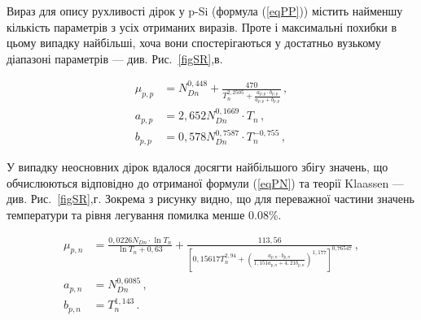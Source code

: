 \documentclass[12pt,a4paper,titlepage,oneside]{book}
\numberwithin{equation}{part}
\begin{document}
Вираз для опису рухливості дірок у p-Si (формула (\ref{eqPP})) містить найменшу кількість параметрів з усіх отриманих виразів.
Проте і максимальні похибки в цьому випадку найбільші, хоча вони спостерігаються у достатньо вузькому діапазоні
параметрів --- див. Рис.~\ref{figSR},в.

\begin{subequations} \label{eqPP}
    \begin{align}
      \mu_{p,p}& =N_{Dn}^{0,448}+\frac{470}{T_n^{2,2505}+\frac{a_{p,p}\cdot b_{p,p}}{a_{p,p}+b_{p,p}}}\,, \label{eqPPa} \\
      a_{p,p} &=2,652 N_{Dn}^{0,1669}\cdot T_n\,, \label{eqPPb} \\
      b_{p,p}& =0,578 N_{Dn}^{0,7587}\cdot T_n^{-0,755}\,, \label{eqPPc}
    \end{align}
\end{subequations}

У випадку неосновних дірок вдалося досягти найбільшого збігу значень,
що обчислюються відповідно до отриманої формули (\ref{eqPN})  та теорії Klaassen --- див. Рис.~\ref{figSR},г.
Зокрема з рисунку видно, що для переважної частини значень температури та рівня легування помилка менше 0.08\%.

\begin{subequations} \label{eqPN}
    \begin{align}
      \mu_{p,n}& =\frac{0,0226N_{Dn}\cdot\ln T_n}{\ln T_n+0,63}
      +\frac{113,56}{\left[0,15617T_n^{2,94}+\left(\frac{a_{p,n}\cdot b_{p,n}}{1,151a_{p,n}+ 4,21 b_{p,n}}\right)^{1,177}\right]^{0,76547}}\,, \label{eqPNa} \\
      a_{p,n} &=N_{Dn}^{0,6085}\,, \label{eqPNb} \\
      b_{p,n}& =T_n^{1,143}\,. \label{eqPNc}
    \end{align}
\end{subequations}
\end{document}
